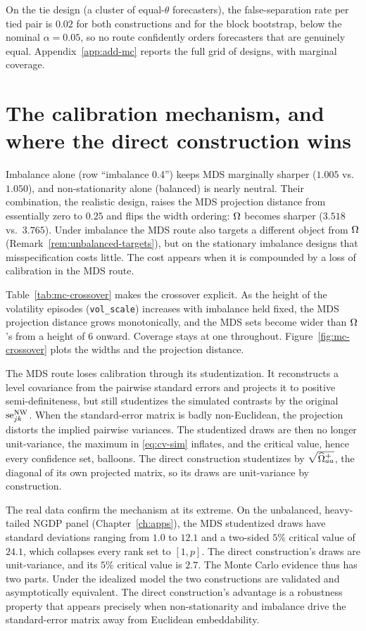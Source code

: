 \tabMcCoverage

On the tie design (a cluster of equal-$\theta$ forecasters), the false-separation rate
per tied pair is $0.02$ for both constructions and for the block bootstrap, below the
nominal $\alpha=0.05$, so no route confidently orders forecasters that are
genuinely equal. Appendix~\ref{app:add-mc} reports the full grid of designs, with
marginal coverage.

\section{The calibration mechanism, and where the direct construction wins}
\label{sec:mc-mechanism}

Imbalance alone (row ``imbalance 0.4'') keeps MDS marginally sharper ($1.005$ vs.\
$1.050$), and non-stationarity alone (balanced) is nearly neutral. Their combination, the
realistic design, raises the MDS projection distance from essentially zero to $0.25$ and
flips the width ordering: $\Omega$ becomes sharper ($3.518$ vs.\ $3.765$). Under
imbalance the MDS route also targets a different object from $\Omega$
(Remark~\ref{rem:unbalanced-targets}), but on the stationary imbalance designs that
misspecification costs little. The cost appears when it is compounded by a loss of
calibration in the MDS route.

Table~\ref{tab:mc-crossover} makes the crossover explicit. As the height of the
volatility episodes (\texttt{vol\_scale}) increases with imbalance held fixed, the MDS
projection distance grows monotonically, and the MDS sets become wider than
$\Omega$'s from a height of $6$ onward. Coverage stays at one throughout.
Figure~\ref{fig:mc-crossover} plots the widths and the projection distance.

\tabMcCrossover

\figMcCrossover

The MDS route loses calibration through its studentization. It reconstructs a level
covariance from the pairwise standard errors and projects it to positive
semi-definiteness, but still studentizes the simulated contrasts by the original
$\mathrm{se}^{\mathrm{NW}}_{jk}$. When the standard-error matrix is badly non-Euclidean, the projection
distorts the implied pairwise variances. The studentized draws are then no longer
unit-variance, the maximum in \eqref{eq:cv-sim} inflates, and the critical value, hence
every confidence set, balloons. The direct construction studentizes by
$\sqrt{\widehat{\Omega}^{+}_{aa}}$, the diagonal of its own projected matrix, so its draws are
unit-variance by construction.

The real data confirm the mechanism at its extreme. On the unbalanced, heavy-tailed NGDP
panel (Chapter~\ref{ch:apps}), the MDS studentized draws have standard deviations ranging
from $1.0$ to $12.1$ and a two-sided $5\%$ critical value of $24.1$, which collapses
every rank set to $[1,p]$. The direct construction's draws are unit-variance, and its
$5\%$ critical value is $2.7$. The Monte Carlo evidence thus has two parts. Under the
idealized model the two constructions are validated and asymptotically equivalent. The
direct construction's advantage is a robustness property that appears precisely when
non-stationarity and imbalance drive the standard-error matrix away from Euclidean
embeddability.

